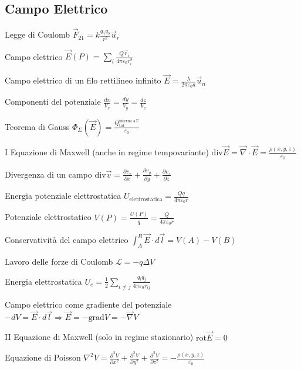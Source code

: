 \documentclass[8pt,a4paper]{article}
\numberwithin{equation}{subsection}
\begin{document}
\begin{multicols}{2}




\section*{Campo Elettrico}

Legge di Coulomb $\vec{F}_{21} =k\frac{q_{1} q_{2}}{r^{2}}\vec{u}_{r}$

Campo elettrico $\vec{E} (P)=\sum _{i}\frac{Q\vec{r}_{i}}{4\pi \varepsilon _{0} r^{3}_{i}}$

Campo elettrico di un filo rettilineo infinito $\vec{E} =\frac{\lambda }{2\pi \varepsilon _{0} a}\vec{u}_{n}$

Componenti del potenziale $\frac{dx}{V_{x}} =\frac{dy}{V_{y}} =\frac{dz}{V_{z}}$

Teorema di Gauss $\Phi _{\Sigma } (\vec{E} )=\frac{Q^{\text{interna a} \Sigma }_{\text{tot}}}{\varepsilon _{0}}$

I Equazione di Maxwell (anche in regime tempovariante) $\text{div}\vec{E} =\vec{\nabla } \cdot \vec{E} =\frac{\rho (x,y,z)}{\varepsilon _{0}}$

Divergenza di un campo $\text{div}\vec{v} =\frac{\partial v_{x}}{\partial x} +\frac{\partial v_{y}}{\partial y} +\frac{\partial v_{z}}{\partial z}$

Energia potenziale elettrostatica $U_{\text{elettrostatica}} =\frac{Qq}{4\pi \varepsilon _{0} r}$

Potenziale elettrostatico $V(P)=\frac{U(P)}{q} =\frac{Q}{4\pi \varepsilon _{0} r}$

Conservatività del campo elettrico $\int ^{B}_{A}\vec{E} \cdot d\vec{l} =V(A)-V(B)$

Lavoro delle forze di Coulomb $\mathcal{L} =-q\Delta V$

Energia elettrostatica $U_{e} =\frac{1}{2}\sum _{i\neq j}\frac{q_{i} q_{j}}{4\pi \varepsilon _{0} r_{ij}}$

Campo elettrico come gradiente del potenziale \\$-dV=\vec{E} \cdot d\vec{l} \Rightarrow \vec{E} =-\text{grad} V=-\vec{\nabla } V$

II Equazione di Maxwell (solo in regime stazionario) $\text{rot}\vec{E} =0$

Equazione di Poisson $\nabla ^{2} V=\frac{\partial ^{2} V}{\partial x^{2}} +\frac{\partial ^{2} V}{\partial y^{2}} +\frac{\partial ^{2} V}{\partial z^{2}} =-\frac{\rho (x,y,z)}{\varepsilon _{0}}$


\end{multicols}
\end{document}
